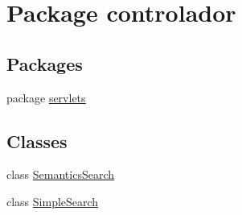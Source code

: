\hypertarget{namespacecontrolador}{}\section{Package controlador}
\label{namespacecontrolador}
\subsection*{Packages}
\begin{DoxyCompactItemize}
\item 
package \hyperlink{namespacecontrolador_1_1servlets}{servlets}
\end{DoxyCompactItemize}
\subsection*{Classes}
\begin{DoxyCompactItemize}
\item 
class \hyperlink{classcontrolador_1_1SemanticsSearch}{Semantics\+Search}
\item 
class \hyperlink{classcontrolador_1_1SimpleSearch}{Simple\+Search}
\end{DoxyCompactItemize}
